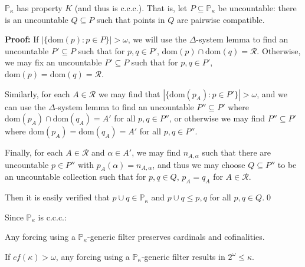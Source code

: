 \documentclass{beamer}
\theoremstyle{theorem}
\theoremstyle{definition}
\newcommand{\<}{\langle}
\renewcommand{\>}{\rangle}
\newcommand{\mc}[1]{\mathcal{#1}}
\newcommand{\po}{\mathbb{P}}
\newcommand{\pok}{\po_\kappa}
\newcommand{\dom}{\textrm{dom}}
\begin{document}
\begin{frame}
  \begin{lemma}
    $\pok$ has property $K$ (and thus is c.c.c.). That is, let $P\subseteq\pok$ be uncountable: there is an uncountable $Q\subseteq P$ such that points in $Q$ are pairwise compatible.
  \end{lemma}\pause

  \textbf{Proof:}
    If $|\{\dom(p):p\in P\}|>\omega$, we will use the $\Delta$-system lemma to find an uncountable $P'\subseteq P$ such that for $p,q\in P'$, $\dom(p)\cap\dom(q)=\mc R$. Otherwise, we may fix an uncountable $P'\subseteq P$ such that for $p,q\in P'$, $\dom(p)=\dom(q)=\mc R$.\pause\vspace{6pt}

    Similarly, for each $A\in\mc{R}$ we may find that $|\{\dom(p_A):p\in P'\}|>\omega$, and we can use the $\Delta$-system lemma to find an uncountable $P''\subseteq P'$ where $\dom(p_A)\cap\dom(q_A)=A'$ for all $p,q\in P''$, or otherwise we may find $P''\subseteq P'$ where $\dom(p_A)=\dom(q_A)=A'$ for all $p,q\in P''$.
\end{frame}
\begin{frame}
    Finally, for each $A\in\mc R$ and $\alpha\in A'$, we may find $n_{A,\alpha}$ such that there are uncountable $p\in P''$ with $p_A(\alpha)=n_{A,\alpha}$, and thus we may choose $Q\subseteq P''$ to be an uncountable collection such that for $p,q\in Q$, $p_A=q_A$ for $A\in\mc R$.\pause\vspace{6pt}

    Then it is easily verified that $p\cup q\in\pok$ and $p\cup q\leq p,q$ for all $p,q\in Q$.\qed\pause\vspace{12pt}

    Since $\pok$ is c.c.c.:

    \begin{corollary}
      Any forcing using a $\pok$-generic filter preserves cardinals and cofinalities.
    \end{corollary}

    \begin{corollary}
      If $cf(\kappa)>\omega$, any forcing using a $\pok$-generic filter results in $2^\omega\leq\kappa$.
    \end{corollary}
\end{frame}
\end{document}
